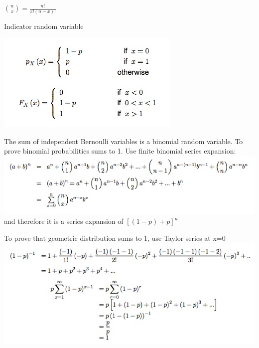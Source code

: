 \documentclass{/out/app/latex/examnotes}
\begin{document}
$\binom{n}{x} = \displaystyle\frac{n!}{x!(n-x)!}$


\vspace{6pt}

\disobeylines
Indicator random variable  %
\obeylines

\includegraphics[scale=0.6]{./img/2ber.jpg}


The sum of independent Bernoulli variables is a binomial random variable. 
To prove binomial probabilities sums to 1. Use finite binomial series expansion:
\includegraphics[scale=0.7]{./img/2ber2.jpg}
\vspace{-10pt}
and therefore it is a series expansion of $[(1-p)+p]^n$
\vspace{6pt}

To prove that geometric distribution sums to 1, use Taylor series at x=0
\includegraphics[scale=0.7]{./img/2geo.jpg}
\end{document}
